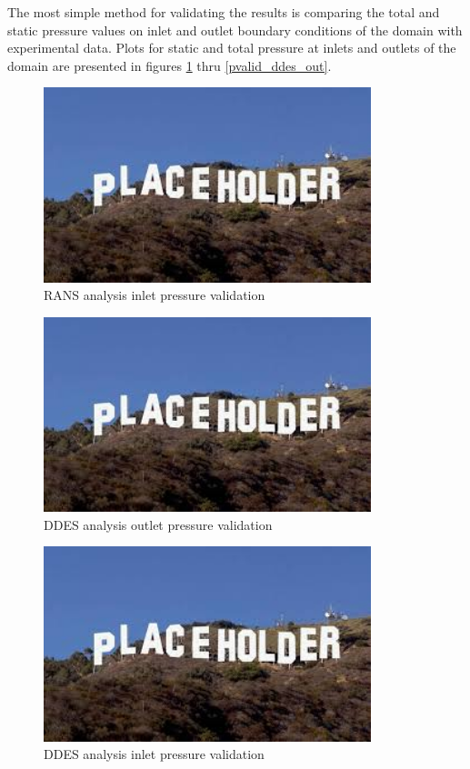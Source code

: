 The most simple method for validating the results is comparing the total and static pressure values on inlet and outlet boundary conditions of the domain with experimental data. Plots for static and total pressure at inlets and outlets of the domain are presented in figures \ref{pvalid_rans_in} thru \ref{pvalid_ddes_out}. 

\begin{figure}[h!]
\centering %
\includegraphics[width=0.85\textwidth]{Pictures/placeholder.jpg}
\caption{RANS analysis inlet pressure validation}
\label{pvalid_rans_in}
\end{figure}

\begin{figure}[h!]
\centering %
\includegraphics[width=0.85\textwidth]{Pictures/placeholder.jpg}
\caption{DDES analysis outlet pressure validation}
\label{pvalid_rans_out}
\end{figure}

\begin{figure}[h!]
\centering %
\includegraphics[width=0.85\textwidth]{Pictures/placeholder.jpg}
\caption{DDES analysis inlet pressure validation}
\label{pvalid_ddes_in}
\end{figure}

